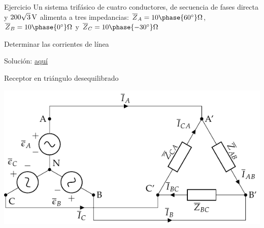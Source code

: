\documentclass[aspectratio=169, usenames,svgnames,dvipsnames]{beamer}
\begin{document}

\begin{frame}{Ejercicio}
    \vspace{19mm}
    Un sistema trifásico de cuatro conductores, de secuencia de fases directa y $\SI[parse-numbers=false]{200\sqrt{3}}{\volt}$ alimenta a tres impedancias: $\overline{Z}_{A} = {10\phase{\ang{60}}}\unit{\ohm}$, $\overline{Z}_{B} = {10\phase{\ang{0}}}\unit{\ohm}$ y $\overline{Z}_{C} = {10\phase{\ang{-30}}}\unit{\ohm}$  

    \vspace{5mm}
    Determinar las corrientes de línea

    \vspace{28mm}
    \alert{Solución}: \href{https://raw.githubusercontent.com/ETSIDI-IE/tc/master/docs/ejercicios_clase/TC1_03_Ejemplo_3_2_libro_LBB.pdf}{aquí}
\end{frame}


\begin{frame}{Receptor en triángulo desequilibrado}
    \begin{center}
        \includegraphics[height=0.85\textheight]{../figs/TrianguloDesequilibrado.pdf}
    \end{center}
\end{frame}

\end{document}
